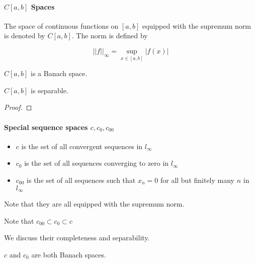 \documentclass{article}
\begin{document}
\paragraph*{$C[a,b]$ Spaces}  
The space of continuous functions on $[a,b]$ equipped with the supremum norm is denoted by $C[a,b]$.  
The norm is defined by   

\begin{equation*}
    ||f||_{\infty}=\sup_{x \in [a,b]} |f(x)|
\end{equation*}

\begin{prop}
    $C[a,b]$ is a Banach space.
\end{prop}  

\begin{thm}
    $C[a,b]$ is separable.
\end{thm}  

\begin{lemma}
    
\end{lemma}  

\begin{proof}

\end{proof}

\paragraph*{Special sequence spaces $c, c_0, c_{00}$}  

\begin{itemize}
    \item $c$ is the set of all convergent sequences in $l_{\infty}$
    \item $c_0$ is the set of all sequences converging to zero in $l_{\infty}$
    \item $c_{00}$ is the set of all sequences such that $x_n=0$ for all
          but finitely many $n$ in $l_{\infty}$
\end{itemize}  

Note that they are all equipped with the supremum norm.  

\begin{remark}
    Note that $c_{00} \subset c_{0} \subset c$
\end{remark}  

We discuss their completeness and separability.  

\begin{prop}
    $c$ and $c_0$ are both Banach spaces.
\end{prop}  
\end{document}
